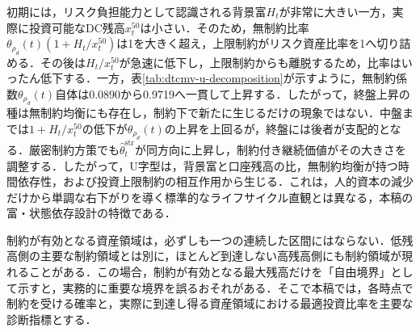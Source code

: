\documentclass[10pt,a4paper]{article}
\theoremstyle{plain}
\theoremstyle{definition}
\begin{document}
\begin{table}[H]
\centering
\scriptsize
\caption{dTCMVの中央値状態におけるU字型グライドパスの成因分解}
\label{tab:dtcmv-u-decomposition}
\end{table}

初期には，リスク負担能力として認識される背景富$H_t$が非常に大きい一方，実際に投資可能なDC残高$x_t^{50}$は小さい．そのため，無制約比率$\theta_{\rho_d}(t)(1+H_t/x_t^{50})$は1を大きく超え，上限制約がリスク資産比率を1へ切り詰める．その後は$H_t/x_t^{50}$が急速に低下し，上限制約からも離脱するため，比率はいったん低下する．一方，表\ref{tab:dtcmv-u-decomposition}が示すように，無制約係数$\theta_{\rho_d}(t)$自体は0.0890から0.9719へ一貫して上昇する．したがって，終盤上昇の種は無制約均衡にも存在し，制約下で新たに生じるだけの現象ではない．中盤までは$1+H_t/x_t^{50}$の低下が$\theta_{\rho_d}(t)$の上昇を上回るが，終盤には後者が支配的となる．厳密制約方策でも$\widehat\theta_t^{\mathrm{str}}$が同方向に上昇し，制約付き継続価値がその大きさを調整する．したがって，U字型は，背景富と口座残高の比，無制約均衡が持つ時間依存性，および投資上限制約の相互作用から生じる．これは，人的資本の減少だけから単調な右下がりを導く標準的なライフサイクル直観とは異なる，本稿の富・状態依存設計の特徴である．

制約が有効となる資産領域は，必ずしも一つの連続した区間にはならない．低残高側の主要な制約領域とは別に，ほとんど到達しない高残高側にも制約領域が現れることがある．この場合，制約が有効となる最大残高だけを「自由境界」として示すと，実務的に重要な境界を誤るおそれがある．そこで本稿では，各時点で制約を受ける確率と，実際に到達し得る資産領域における最適投資比率を主要な診断指標とする．
\end{document}
